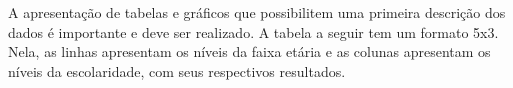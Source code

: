 \documentclass[
]{book}
\newenvironment{Shaded}{\begin{snugshade}}{\end{snugshade}}
\newcommand{\CommentTok}[1]{\textcolor[rgb]{0.56,0.35,0.01}{\textit{#1}}}
\newcommand{\DataTypeTok}[1]{\textcolor[rgb]{0.13,0.29,0.53}{#1}}
\newcommand{\KeywordTok}[1]{\textcolor[rgb]{0.13,0.29,0.53}{\textbf{#1}}}
\newcommand{\NormalTok}[1]{#1}
\newcommand{\OperatorTok}[1]{\textcolor[rgb]{0.81,0.36,0.00}{\textbf{#1}}}
\newcommand{\OtherTok}[1]{\textcolor[rgb]{0.56,0.35,0.01}{#1}}
\newcommand{\StringTok}[1]{\textcolor[rgb]{0.31,0.60,0.02}{#1}}
\begin{document}
A apresentação de tabelas e gráficos que possibilitem uma primeira
descrição dos dados é importante e deve ser realizado. A tabela a seguir
tem um formato 5x3. Nela, as linhas apresentam os níveis da faixa etária
e as colunas apresentam os níveis da escolaridade, com seus respectivos
resultados.

\begin{Shaded}
\end{Shaded}
\end{document}
